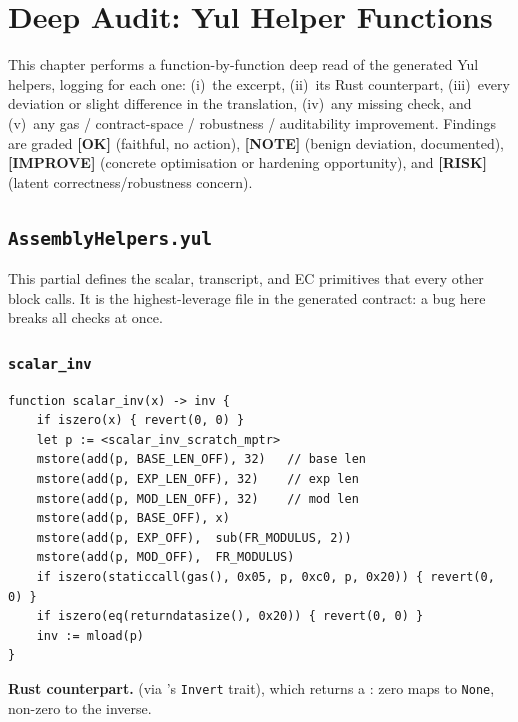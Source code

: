 \chapter{Deep Audit: Yul Helper Functions}
\label{ch:deep-audit}

This chapter performs a function-by-function deep read of the generated
Yul helpers, logging for each one: (i)~the excerpt, (ii)~its Rust
counterpart, (iii)~every deviation or slight difference in the
translation, (iv)~any missing check, and (v)~any gas / contract-space /
robustness / auditability improvement. Findings are graded
\textcolor{tracegreen}{\textbf{[OK]}} (faithful, no action),
\textcolor{mathpurple}{\textbf{[NOTE]}} (benign deviation, documented),
\textcolor{codegenblue}{\textbf{[IMPROVE]}} (concrete optimisation or
hardening opportunity), and
\textcolor{rustorange}{\textbf{[RISK]}} (latent correctness/robustness
concern).

\section{\texttt{AssemblyHelpers.yul}}
\label{sec:asm-helpers}

This partial defines the scalar, transcript, and EC primitives that every
other block calls. It is the highest-leverage file in the generated
contract: a bug here breaks all checks at once.

\subsection{\texttt{scalar\_inv}}
\label{sec:scalar-inv}

\begin{lstlisting}[style=yul]
function scalar_inv(x) -> inv {
    if iszero(x) { revert(0, 0) }
    let p := <scalar_inv_scratch_mptr>
    mstore(add(p, BASE_LEN_OFF), 32)   // base len
    mstore(add(p, EXP_LEN_OFF), 32)    // exp len
    mstore(add(p, MOD_LEN_OFF), 32)    // mod len
    mstore(add(p, BASE_OFF), x)
    mstore(add(p, EXP_OFF),  sub(FR_MODULUS, 2))
    mstore(add(p, MOD_OFF),  FR_MODULUS)
    if iszero(staticcall(gas(), 0x05, p, 0xc0, p, 0x20)) { revert(0, 0) }
    if iszero(eq(returndatasize(), 0x20)) { revert(0, 0) }
    inv := mload(p)
}
\end{lstlisting}

\textbf{Rust counterpart.}  (via 's
\texttt{Invert} trait), which returns a : zero maps to
\texttt{None}, non-zero to the inverse.

